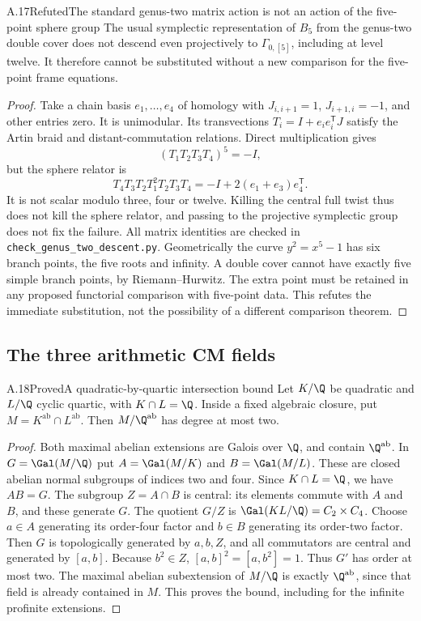\begin{statement}{A.17}{Refuted}{The standard genus-two matrix action is not an action of the five-point sphere group}
The usual symplectic representation of $B_5$ from the genus-two
double cover does not descend even projectively to
$\Gamma_{0,[5]}$, including at level twelve. It therefore
cannot be substituted without a new comparison for the
five-point frame equations.
\end{statement}
\begin{proof}
Take a chain basis $e_1,\ldots,e_4$ of homology with
$J_{i,i+1}=1$, $J_{i+1,i}=-1$, and other entries zero.
It is unimodular. Its transvections
$T_i=I+e_i e_i^{\mathsf T}J$ satisfy the Artin braid
and distant-commutation relations. Direct multiplication gives
\[
 (T_1T_2T_3T_4)^5=-I,
\]
but the sphere relator is
\[
 T_4T_3T_2T_1^2T_2T_3T_4
 =-I+2(e_1+e_3)e_4^{\mathsf T}.
\]
It is not scalar modulo three, four or twelve. Killing
the central full twist thus does not kill the sphere
relator, and passing to the projective symplectic group
does not fix the failure. All matrix identities are
checked in \texttt{check\_genus\_two\_descent.py}.
Geometrically the curve $y^2=x^5-1$ has six branch
points, the five roots and infinity. A double cover
cannot have exactly five simple branch points, by
Riemann--Hurwitz. The extra point must be retained in
any proposed functorial comparison with five-point data.
This refutes the immediate substitution, not the
possibility of a different comparison theorem.
\end{proof}

\subsection{The three arithmetic CM fields}


\begin{statement}{A.18}{Proved}{A quadratic-by-quartic intersection bound}
Let $K/\Q$ be quadratic and $L/\Q$ cyclic quartic, with $K\cap L=\Q$.
Inside a fixed algebraic closure, put $M=K^{\mathrm{ab}}\cap L^{\mathrm{ab}}$.
Then $M/\Q^{\mathrm{ab}}$ has degree at most two.
\end{statement}
\begin{proof}
Both maximal abelian extensions are Galois over $\Q$, and contain
$\Q^{\mathrm{ab}}$. In $G=\Gal(M/\Q)$ put
$A=\Gal(M/K)$ and $B=\Gal(M/L)$. These are closed abelian normal
subgroups of indices two and four. Since $K\cap L=\Q$, we have
$AB=G$. The subgroup $Z=A\cap B$ is central: its elements commute
with $A$ and $B$, and these generate $G$. The quotient $G/Z$ is
$\Gal(KL/\Q)=C_2\times C_4$. Choose $a\in A$ generating its
order-four factor and $b\in B$ generating its order-two factor.
Then $G$ is topologically generated by $a,b,Z$, and all commutators
are central and generated by $[a,b]$. Because $b^2\in Z$,
$[a,b]^2=[a,b^2]=1$. Thus $G'$ has order at most two. The maximal
abelian subextension of $M/\Q$ is exactly $\Q^{\mathrm{ab}}$,
since that field is already contained in $M$. This proves the bound,
including for the infinite profinite extensions.
\end{proof}

